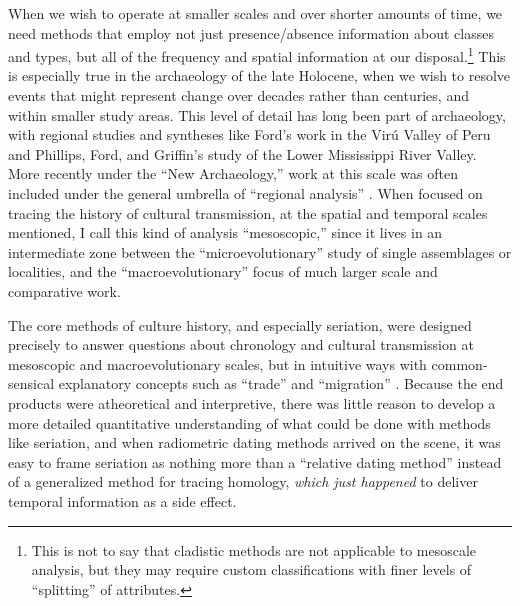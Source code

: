     When we wish to operate at smaller scales and over shorter amounts of time, we need methods that employ not just presence/absence information about classes and types, but all of the frequency and spatial information at our disposal.\footnote{This is not to say that cladistic methods are not applicable to mesoscale analysis, but they may require custom classifications with finer levels of ``splitting'' of attributes.}  This is especially true in the archaeology of the late Holocene, when we wish to resolve events that might represent change over decades rather than centuries, and within smaller study areas.  This level of detail has long been part of archaeology, with regional studies and syntheses like Ford's work in the Vir\'u Valley of Peru \citep{Ford1949} and Phillips, Ford, and Griffin's \citeyearpar{PFG1951} study of the Lower Mississippi River Valley.  More recently under the ``New Archaeology,'' work at this scale was often included under the general umbrella of ``regional analysis'' \citep{johnson1977aspects}.  When focused on tracing the history of cultural transmission, at the spatial and temporal scales mentioned, I call this kind of analysis ``mesoscopic,'' since it lives in an intermediate zone between the ``microevolutionary'' study of single assemblages or localities, and the ``macroevolutionary'' focus of much larger scale and comparative work.  
    
    The core methods of culture history, and especially seriation, were designed precisely to answer questions about chronology and cultural transmission at mesoscopic and macroevolutionary scales, but in intuitive ways with common-sensical explanatory concepts such as ``trade'' and ``migration'' \citep{o2000applying,lyman1997rise,lyman2008cultural}.  Because the end products were atheoretical and interpretive, there was little reason to develop a more detailed quantitative understanding of what could be done with methods like seriation, and when radiometric dating methods arrived on the scene, it was easy to frame seriation as nothing more than a ``relative dating method'' instead of a generalized method for tracing homology, \emph{which just happened} to deliver temporal information as a side effect.  
    
